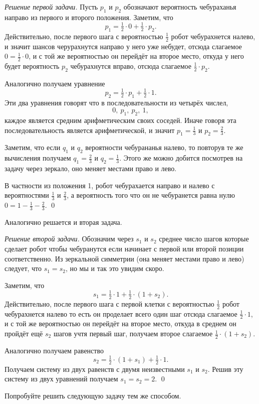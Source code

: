\documentclass{article}
\begin{document}
\medskip
\noindent\textit{Решение первой задачи.}
Пусть $p_1$ и $p_2$ обозначают вероятность чебураханья направо из первого и второго положения. 
Заметим, что
\[p_1=\tfrac12\cdot0+\tfrac12\cdot p_2.\]
Действительно, после первого шага 
с вероятностью $\tfrac12$ робот чебурахнется налево,
и значит шансов черурахнутся направо у него уже небудет, 
отсюда слагаемое $0=\tfrac12\cdot0$,
и с той же вероятностью он перейдёт на второе место,
откуда у него будет вероятность $p_2$ чебурахнутся вправо,
отсюда слагаемое $\tfrac12\cdot p_2$.

Аналогично получаем уравнение 
\[p_2=\tfrac12\cdot p_1+\tfrac12\cdot 1.\]
Эти два уравнения говорят что в последовательности из четырёх числел, 
\[0,\  p_1,\  p_2,\ 1,\]
каждое является средним арифметическим своих соседей.
Иначе говоря эта последовательность является арифметической, 
и значит $p_1=\tfrac13$ и $p_2=\tfrac23$.

Заметим, что если $q_1$ и $q_2$ вероятности чебурананья налево, 
то повторув те же вычисления получаем $q_1=\tfrac23$ и $q_2=\tfrac13$.
Этого же можно добится посмотрев на задачу через зеркало, оно меняет местами право и лево.

В частности из положения 1, робот чебурахается направо и налево с вероятностями $\tfrac13$ и $\tfrac23$, 
а вероятность того что он не чебуранется равна нулю $0=1-\tfrac13-\tfrac23$.
\qed
\medskip

Аналогично решается и вторая задача.

\medskip
\noindent\textit{Решение второй задачи.}
Обозначим через $s_1$ и $s_2$ среднее число шагов которые сделает робот чтобы чебуранутся
если начинает с первой или второй позиции соответственно.
Из зеркальной симметрии (она меняет местами право и лево) следует, что $s_1=s_2$,
но мы и так это увидим скоро.

Заметим, что 
\[s_1=\tfrac12\cdot1+\tfrac12\cdot (1+s_2).\]
Действительно, после первого шага с первой клетки
с вероятностью $\tfrac12$ робот чебурахнется налево то есть он проделает всего один шаг
отсюда слагаемое $\tfrac12\cdot1$,
и с той же вероятностью он перейдёт на второе место,
откуда в среднем он пройдёт ещё $s_2$ шагов
учтя первый шаг, получаем второе слагаемое $\tfrac12\cdot (1+s_2)$.

Аналогично получаем равенство
\[s_2=\tfrac12\cdot (1+s_1)+\tfrac12\cdot 1.\]
Получаем систему из двух равенств с двумя неизвестными $s_1$ и $s_2$.
Решив эту систему из двух уравнений получаем 
$s_1=s_2=2$.
\qed
\medskip

Попробуйте решить следующую задачу тем же способом.
\end{document}

